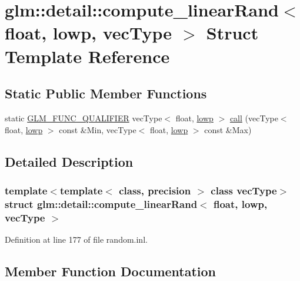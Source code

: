 \hypertarget{structglm_1_1detail_1_1compute__linear_rand_3_01float_00_01lowp_00_01vec_type_01_4}{}\section{glm\+::detail\+::compute\+\_\+linear\+Rand$<$ float, lowp, vec\+Type $>$ Struct Template Reference}
\label{structglm_1_1detail_1_1compute__linear_rand_3_01float_00_01lowp_00_01vec_type_01_4}
\subsection*{Static Public Member Functions}
\begin{DoxyCompactItemize}
\item 
static \mbox{\hyperlink{setup_8hpp_a33fdea6f91c5f834105f7415e2a64407}{G\+L\+M\+\_\+\+F\+U\+N\+C\+\_\+\+Q\+U\+A\+L\+I\+F\+I\+ER}} vec\+Type$<$ float, \mbox{\hyperlink{namespaceglm_a0f04f086094c747d227af4425893f545ae161af3fc695e696ce3bf69f7332bc2d}{lowp}} $>$ \mbox{\hyperlink{structglm_1_1detail_1_1compute__linear_rand_3_01float_00_01lowp_00_01vec_type_01_4_a7fa98be90215a865635df999883a55ca}{call}} (vec\+Type$<$ float, \mbox{\hyperlink{namespaceglm_a0f04f086094c747d227af4425893f545ae161af3fc695e696ce3bf69f7332bc2d}{lowp}} $>$ const \&Min, vec\+Type$<$ float, \mbox{\hyperlink{namespaceglm_a0f04f086094c747d227af4425893f545ae161af3fc695e696ce3bf69f7332bc2d}{lowp}} $>$ const \&Max)
\end{DoxyCompactItemize}


\subsection{Detailed Description}
\subsubsection*{template$<$template$<$ class, precision $>$ class vec\+Type$>$\newline
struct glm\+::detail\+::compute\+\_\+linear\+Rand$<$ float, lowp, vec\+Type $>$}



Definition at line 177 of file random.\+inl.



\subsection{Member Function Documentation}
\mbox{\label{structglm_1_1detail_1_1compute__linear_rand_3_01float_00_01lowp_00_01vec_type_01_4_a7fa98be90215a865635df999883a55ca}} 
